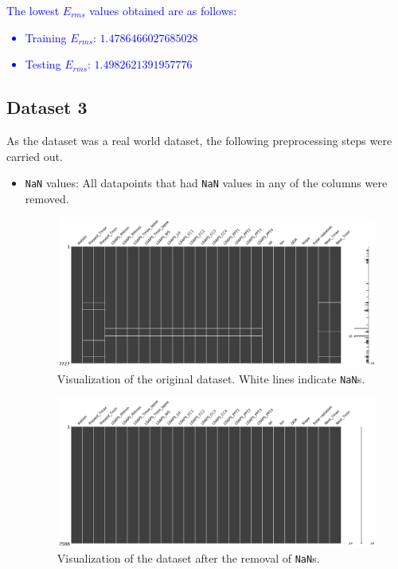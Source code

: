 \documentclass[12pt,a4paper]{article}
\newcommand{\noi}{\noindent}
\def\tt#1{\texttt{#1}}
\begin{document}
\noi
\textcolor{blue}{The lowest $E_{rms}$ values obtained are as follows:
\begin{itemize}
    \itemsep0em
    \item Training $E_{rms}$: $1.4786466027685028$
    \item Testing $E_{rms}$: $1.4982621391957776$
\end{itemize}
}

\subsection{Dataset 3}
As the dataset was a real world dataset, the following preprocessing steps were carried out.
\begin{itemize}
    \itemsep0em
    \item \tt{NaN} values: All datapoints that had \tt{NaN} values in any of the columns were removed. 
        \begin{figure}[H]
            \centering
            \includegraphics[scale=0.3]{images/missingno.png}
            \caption{Visualization of the original dataset. White lines indicate \tt{NaN}s.}
        \end{figure}

        \begin{figure}[H]
            \centering
            \includegraphics[scale=0.3]{images/cleaned.png}
            \caption{Visualization of the dataset after the removal of \tt{NaN}s.}
        \end{figure}


\end{itemize}
\end{document}
